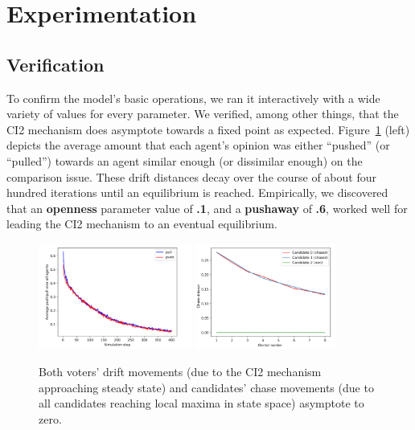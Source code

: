 \section{Experimentation}
\label{sec:experimentation}

\subsection{Verification}

To confirm the model's basic operations, we ran it interactively with a wide
variety of values for every parameter. We verified, among other things, that
the CI2 mechanism does asymptote towards a fixed point as expected.
Figure~\ref{drifts_and_chases_asymptote} (left) depicts the average amount that
each agent's opinion was either ``pushed'' (or ``pulled'') towards an agent
similar enough (or dissimilar enough) on the comparison issue. These drift
distances decay over the course of about four hundred iterations until an
equilibrium is reached. Empirically, we discovered that an \textbf{openness}
parameter value of \textbf{.1}, and a \textbf{pushaway} of \textbf{.6}, worked
well for leading the CI2 mechanism to an eventual equilibrium.

\begin{figure}[ht]
\centering
\includegraphics[width=0.45\textwidth]{assets/drifts_asymptote.png}
\includegraphics[width=0.41\textwidth]{assets/chase_dists_updated.png}
\caption{Both voters' drift movements (due to the CI2 mechanism approaching steady
state) and candidates' chase movements (due to all candidates reaching local
maxima in state space) asymptote to zero.}
\label{drifts_and_chases_asymptote}
\end{figure}

